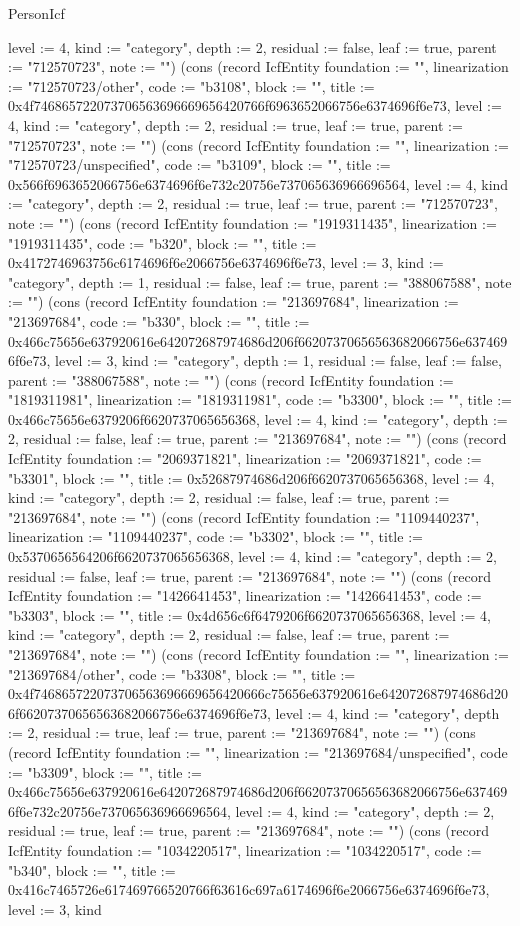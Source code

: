 \begin{lexlean}{PersonIcf}
\begin{semanticmodule}
{level := 4, kind := "category", depth := 2, residual := false, leaf := true, parent := "712570723", note := ""}) (cons (record IcfEntity {foundation := "", linearization := "712570723/other", code := "b3108", block := "", title := 0x4f746865722073706563696669656420766f6963652066756e6374696f6e73, level := 4, kind := "category", depth := 2, residual := true, leaf := true, parent := "712570723", note := ""}) (cons (record IcfEntity {foundation := "", linearization := "712570723/unspecified", code := "b3109", block := "", title := 0x566f6963652066756e6374696f6e732c20756e737065636966696564, level := 4, kind := "category", depth := 2, residual := true, leaf := true, parent := "712570723", note := ""}) (cons (record IcfEntity {foundation := "1919311435", linearization := "1919311435", code := "b320", block := "", title := 0x4172746963756c6174696f6e2066756e6374696f6e73, level := 3, kind := "category", depth := 1, residual := false, leaf := true, parent := "388067588", note := ""}) (cons (record IcfEntity {foundation := "213697684", linearization := "213697684", code := "b330", block := "", title := 0x466c75656e637920616e642072687974686d206f66207370656563682066756e6374696f6e73, level := 3, kind := "category", depth := 1, residual := false, leaf := false, parent := "388067588", note := ""}) (cons (record IcfEntity {foundation := "1819311981", linearization := "1819311981", code := "b3300", block := "", title := 0x466c75656e6379206f6620737065656368, level := 4, kind := "category", depth := 2, residual := false, leaf := true, parent := "213697684", note := ""}) (cons (record IcfEntity {foundation := "2069371821", linearization := "2069371821", code := "b3301", block := "", title := 0x52687974686d206f6620737065656368, level := 4, kind := "category", depth := 2, residual := false, leaf := true, parent := "213697684", note := ""}) (cons (record IcfEntity {foundation := "1109440237", linearization := "1109440237", code := "b3302", block := "", title := 0x5370656564206f6620737065656368, level := 4, kind := "category", depth := 2, residual := false, leaf := true, parent := "213697684", note := ""}) (cons (record IcfEntity {foundation := "1426641453", linearization := "1426641453", code := "b3303", block := "", title := 0x4d656c6f6479206f6620737065656368, level := 4, kind := "category", depth := 2, residual := false, leaf := true, parent := "213697684", note := ""}) (cons (record IcfEntity {foundation := "", linearization := "213697684/other", code := "b3308", block := "", title := 0x4f746865722073706563696669656420666c75656e637920616e642072687974686d206f66207370656563682066756e6374696f6e73, level := 4, kind := "category", depth := 2, residual := true, leaf := true, parent := "213697684", note := ""}) (cons (record IcfEntity {foundation := "", linearization := "213697684/unspecified", code := "b3309", block := "", title := 0x466c75656e637920616e642072687974686d206f66207370656563682066756e6374696f6e732c20756e737065636966696564, level := 4, kind := "category", depth := 2, residual := true, leaf := true, parent := "213697684", note := ""}) (cons (record IcfEntity {foundation := "1034220517", linearization := "1034220517", code := "b340", block := "", title := 0x416c7465726e617469766520766f63616c697a6174696f6e2066756e6374696f6e73, level := 3, kind }
\end{semanticmodule}
\end{lexlean}
